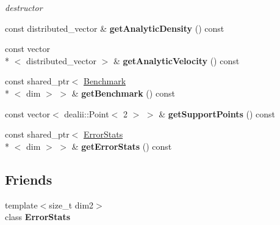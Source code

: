 \begin{DoxyCompactItemize}
\begin{DoxyCompactList}\small\item\em destructor \end{DoxyCompactList}\item 
\hypertarget{classnatrium_1_1BenchmarkCFDSolver_a3c2c8da9004e370209db1b611a136fe9}{const distributed\-\_\-vector \& {\bfseries get\-Analytic\-Density} () const }\label{classnatrium_1_1BenchmarkCFDSolver_a3c2c8da9004e370209db1b611a136fe9}

\item 
\hypertarget{classnatrium_1_1BenchmarkCFDSolver_aee14ac9e3a9d36960d16f0b4899a3c08}{const vector\\*
$<$ distributed\-\_\-vector $>$ \& {\bfseries get\-Analytic\-Velocity} () const }\label{classnatrium_1_1BenchmarkCFDSolver_aee14ac9e3a9d36960d16f0b4899a3c08}

\item 
\hypertarget{classnatrium_1_1BenchmarkCFDSolver_aa5a174cf76431ba7b1721f1ce55df967}{const shared\-\_\-ptr$<$ \hyperlink{classnatrium_1_1Benchmark}{Benchmark}\\*
$<$ dim $>$ $>$ \& {\bfseries get\-Benchmark} () const }\label{classnatrium_1_1BenchmarkCFDSolver_aa5a174cf76431ba7b1721f1ce55df967}

\item 
\hypertarget{classnatrium_1_1BenchmarkCFDSolver_a7d71686aaf03be14827bded582f76e71}{const vector$<$ dealii\-::\-Point$<$ 2 $>$ $>$ \& {\bfseries get\-Support\-Points} () const }\label{classnatrium_1_1BenchmarkCFDSolver_a7d71686aaf03be14827bded582f76e71}

\item 
\hypertarget{classnatrium_1_1BenchmarkCFDSolver_ac015d170b19024e63ff43f4a2e516fef}{const shared\-\_\-ptr$<$ \hyperlink{classnatrium_1_1ErrorStats}{Error\-Stats}\\*
$<$ dim $>$ $>$ \& {\bfseries get\-Error\-Stats} () const }\label{classnatrium_1_1BenchmarkCFDSolver_ac015d170b19024e63ff43f4a2e516fef}

\end{DoxyCompactItemize}
\subsection*{Friends}
\begin{DoxyCompactItemize}
\item 
\hypertarget{classnatrium_1_1BenchmarkCFDSolver_af0f098157b0009154b8effd1fb919fe6}{{\footnotesize template$<$size\-\_\-t dim2$>$ }\\class {\bfseries Error\-Stats}}\label{classnatrium_1_1BenchmarkCFDSolver_af0f098157b0009154b8effd1fb919fe6}

\end{DoxyCompactItemize}
